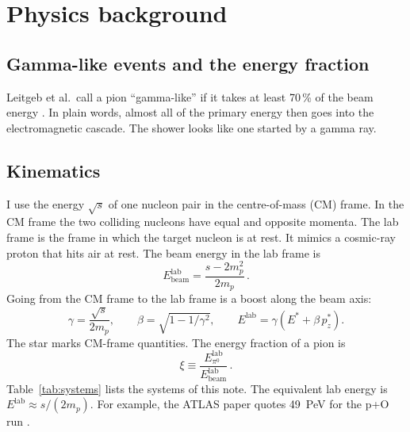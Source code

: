 \documentclass[11pt,a4paper]{article}
\newcommand{\pizero}{\ensuremath{\pi^{0}}}
\begin{document}
\section{Physics background}
\subsection{Gamma-like events and the energy fraction}
Leitgeb et al.\ call a pion ``gamma-like'' if it takes at least 70\,\% of the beam energy \cite{Leitgeb:2025prd}.
In plain words, almost all of the primary energy then goes into the electromagnetic cascade.
The shower looks like one started by a gamma ray.

\subsection{Kinematics}
I use the energy $\sqrt{s}$ of one nucleon pair in the centre-of-mass (CM) frame.
In the CM frame the two colliding nucleons have equal and opposite momenta.
The lab frame is the frame in which the target nucleon is at rest.
It mimics a cosmic-ray proton that hits air at rest.
The beam energy in the lab frame is
\begin{equation}
  E_{\mathrm{beam}}^{\mathrm{lab}} = \frac{s-2m_p^2}{2m_p}\,.
  \label{eq:ebeam}
\end{equation}
Going from the CM frame to the lab frame is a boost along the beam axis:
\begin{equation}
  \gamma=\frac{\sqrt{s}}{2m_p},\qquad \beta=\sqrt{1-1/\gamma^{2}},\qquad
  E^{\mathrm{lab}}=\gamma\left(E^{*}+\beta\,p_z^{*}\right).
  \label{eq:boost}
\end{equation}
The star marks CM-frame quantities.
The energy fraction of a pion is
\begin{equation}
  \xi \equiv \frac{E^{\mathrm{lab}}_{\pizero}}{E^{\mathrm{lab}}_{\mathrm{beam}}}\,.
  \label{eq:xi}
\end{equation}
Table~\ref{tab:systems} lists the systems of this note.
The equivalent lab energy is $E^{\mathrm{lab}}\approx s/(2m_p)$.
For example, the ATLAS paper quotes 49~PeV for the p+O run \cite{ATLAS:2026po}.
\end{document}
